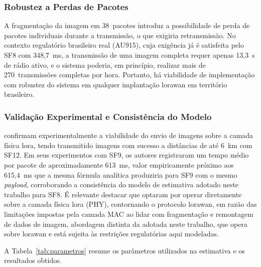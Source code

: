 \subsubsection{Robustez a Perdas de Pacotes}
 
A fragmentação da imagem em 38~pacotes introduz a possibilidade de perda de pacotes
individuais durante a transmissão, o que exigiria retransmissão. 
No contexto regulatório brasileiro real (AU915), cuja exigência já é satisfeita pelo SF8 com 348,7~ms, a
transmissão de uma imagem completa requer apenas 13,3~s de rádio ativo, e o sistema
poderia, em princípio, realizar mais de 270~transmissões completas por hora. 
Portanto, há viabilidade de implementação com robustez do sistema em qualquer 
implantação \gls{lorawan} em território brasileiro.
 
\subsubsection{Validação Experimental e Consistência do Modelo}
 
 confirmam experimentalmente a viabilidade do envio de imagens
sobre a camada física \gls{lora}, tendo transmitido imagens com sucesso a distâncias de até
6~km com SF12. Em seus experimentos com SF9, os autores registraram um tempo médio
por pacote de aproximadamente 613~ms, valor empiricamente próximo aos 615,4~ms
que a mesma fórmula analítica produziria para SF9 com o mesmo \textit{\gls{payload}},
corroborando a consistência do modelo de estimativa adotado neste trabalho para SF8.
É relevante destacar que  optaram por operar diretamente sobre
a camada física \gls{lora} (PHY), contornando o protocolo \gls{lorawan}, em razão das
limitações impostas pela camada MAC ao lidar com fragmentação e remontagem de dados
de imagem, abordagem distinta da adotada neste trabalho, que opera sobre \gls{lorawan}
e está sujeita às restrições regulatórias aqui modeladas.
 
A Tabela~\ref{tab:parametros} resume os parâmetros utilizados na estimativa e os
resultados obtidos.
 
